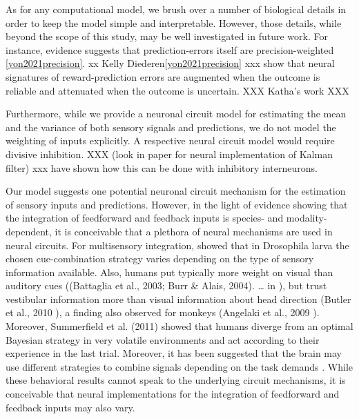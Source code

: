 \documentclass[10pt,a4paper,draft]{article}
\begin{document}

As for any computational model, we brush over a number of biological details in order to keep the model simple and interpretable. However, those details, while beyond the scope of this study, may be well investigated in future work. For instance, evidence suggests that prediction-errors itself are precision-weighted \ref{yon2021precision}. xx Kelly Diederen\ref{yon2021precision} xxx show that neural signatures of reward-prediction errors are augmented when the outcome is reliable and attenuated when the outcome is uncertain. XXX Katha’s work XXX

Furthermore, while we provide a neuronal circuit model for estimating the mean and the variance of both sensory signals and predictions, we do not model the weighting of inputs explicitly. A respective neural circuit model would require divisive inhibition. XXX (look in paper for neural implementation of Kalman filter) xxx have shown how this can be done with inhibitory interneurons. 

Our model suggests one potential neuronal circuit mechanism for the estimation of sensory inputs and predictions. However, in the light of evidence showing that the integration of feedforward and feedback inputs is species- and modality-dependent, it is conceivable that a plethora of neural mechanisms are used in neural circuits. For multisensory integration, \citep{wong2023computational} showed that in Drosophila larva the chosen cue-combination strategy varies depending on the type of sensory information available. Also, humans put typically more weight on visual than auditory cues ((Battaglia et al., 2003; Burr \& Alais, 2004). … in \citep{o2012can}), but trust vestibular information more than visual information about head direction (Butler et al., 2010 \citep{o2012can}), a finding also observed for monkeys (Angelaki et al., 2009 \citep{o2012can}). Moreover, Summerfield et al. (2011) \citep{o2012can} showed that humans diverge from an optimal Bayesian strategy in very volatile environments and act according to their experience in the last trial. Moreover, it has been suggested that the brain may use different strategies to combine signals depending on the task demands \citep{o2012can}. While these behavioral results cannot speak to the underlying circuit mechanisms, it is conceivable that neural implementations for the integration of feedforward and feedback inputs may also vary.

\end{document}
